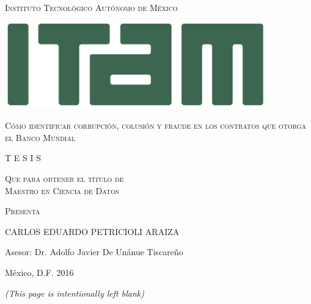 
\thispagestyle{empty}
\begin{center}
\Large \scshape Instituto Tecnológico Autónomo de México \\
\end{center}

\vspace{4mm}



\begin{center}
\includegraphics[scale=.72]{../img/ITAM.jpg}


\vspace{15mm}


\scshape \Large Cómo identificar corrupción, colusión y fraude en los contratos que otorga el Banco Mundial

\vfill
\scshape \large T E S I S 


\vspace{3mm}
\scshape Que para obtener el título de \\

\vspace{3mm}
\scshape Maestro en Ciencia de Datos

\vspace{3mm}
\scshape Presenta

\vspace{4mm}
\Large CARLOS EDUARDO PETRICIOLI ARAIZA


\vspace{5mm}

\large Asesor: Dr.  Adolfo Javier De Unánue Tiscareño
\end{center}
\vspace{10mm}
México, D.F.   \hfill       2016


\newpage

\thispagestyle{empty}

\begin{flushright}
\textit{(This page is intentionally left blank)}
\end{flushright}

\newpage
\thispagestyle{plain}
\setcounter{page}{1}

